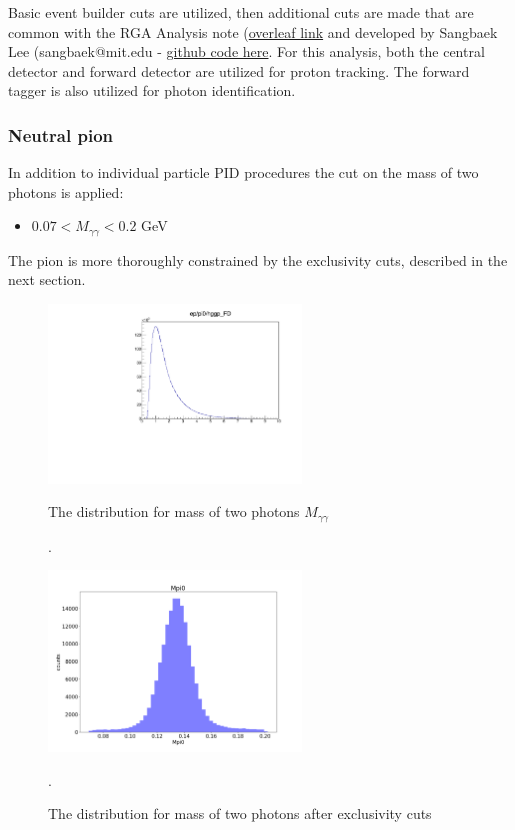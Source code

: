     Basic event builder cuts are utilized, then additional cuts are made that are common with the RGA Analysis note (\href{https://www.overleaf.com/project/5ea737720942930001ff5e9c}{overleaf link} and developed by Sangbaek Lee (sangbaek@mit.edu - \href{https://github.com/Sangbaek/analysis_code/tree/analysis/pid}{github code here}. For this analysis, both the central detector and forward detector are utilized for proton tracking. The forward tagger is also utilized for photon identification. 
    


\subsubsection{Neutral pion}
    In addition to individual particle PID procedures the cut on the mass of two photons is applied:
    \begin{itemize}
    	\item $0.07<M_{\gamma\gamma}<0.2$ GeV
    \end{itemize}
    The pion is more thoroughly constrained by the exclusivity cuts, described in the next section.
    

\begin{figure}[hbt]
	\centering
	\includegraphics[page=6,width=0.6\textwidth]{Chapters/Ch2-Experiment/recon_pid/pid_figs/eppi0.exclusive.pdf}
	
	\caption{The distribution for mass of two photons $M_{\gamma\gamma}$}.
	\label{fig:ggmass}
	
	\centering
	\includegraphics[width=0.6\textwidth]{Chapters/Ch2-Experiment/recon_pid/pid_figs/Mpi0.png}
	
	\caption{The distribution for mass of two photons after exclusivity cuts}.
	\label{fig:ggmass_after}
	
\end{figure}




